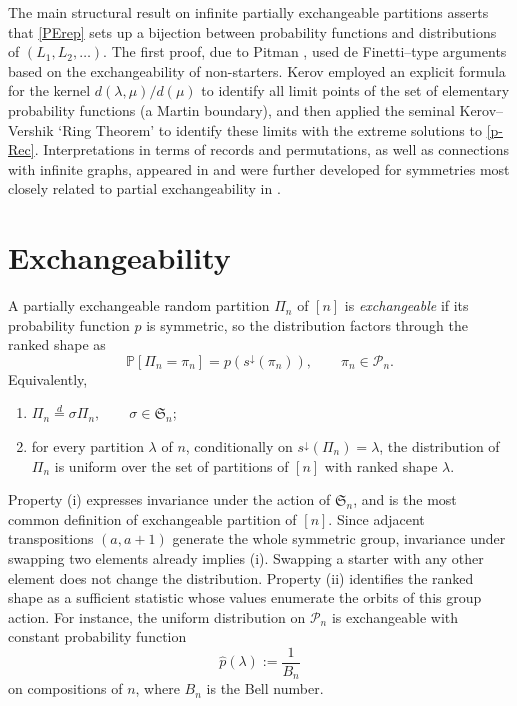 \documentclass{article}
\begin{document}
The main structural result on infinite partially exchangeable partitions 
asserts that \eqref{PErep} sets up a bijection between probability functions
and distributions of $(L_1,L_2,\ldots)$. The first proof, due to Pitman \cite{PitmanPTRF},
used de Finetti--type arguments based on the exchangeability of non-starters.
Kerov \cite{Kerov} employed 
an explicit formula for the kernel
$d(\lambda,\mu)/d(\mu)$ to identify all limit points of the set of elementary
probability functions (a Martin boundary), and then applied the seminal
Kerov--Vershik `Ring Theorem' to identify these limits with the extreme
solutions to \eqref{p-Rec}.
Interpretations in terms of records and permutations, as well as connections
with infinite graphs, appeared in \cite{Kerov} and were further developed for
symmetries most closely related to partial exchangeability in
\cite{GCEP, G11}.



\section{Exchangeability} 

\noindent
A partially exchangeable random partition $\Pi_n$ of $[n]$ is {\it exchangeable}
if its probability function $p$ is symmetric, so the distribution factors through the ranked shape as
\begin{equation}\label{Fin-Ex}
{\mathbb P}[\Pi_n=\pi_n]
=
p\!\left(s^\downarrow(\pi_n)\right),
\qquad \pi_n\in{\mathcal P}_n.
\end{equation}
Equivalently,
\begin{enumerate}
\item[(i)] $\Pi_n\stackrel{d}{=}\sigma\Pi_n,\qquad \sigma\in{\mathfrak S}_n$;
\item[(ii)] for every partition $\lambda$ of $n$, conditionally on
$s^\downarrow(\Pi_n)=\lambda$, the distribution of $\Pi_n$ is uniform over
the set of partitions of $[n]$ with ranked shape $\lambda$.
\end{enumerate}
Property (i)  expresses invariance under the action of ${\mathfrak S}_n$, and is the most common definition of exchangeable partition of $[n]$.
Since adjacent transpositions  $(a, a+1)$ generate the whole symmetric group, invariance under
swapping two elements already implies (i). Swapping a starter with any other element does not change the distribution.
Property (ii) identifies the ranked shape as a sufficient statistic whose values
enumerate  the orbits of
this group action. For instance, the uniform distribution on $\mathcal P_n$ is exchangeable with constant probability function 
\begin{equation}\label{Bell}
\widehat{p}(\lambda):=\frac{1}{B_n}
\end{equation}
 on compositions of $n$, 
where $B_n$ is the Bell number.
\end{document}
